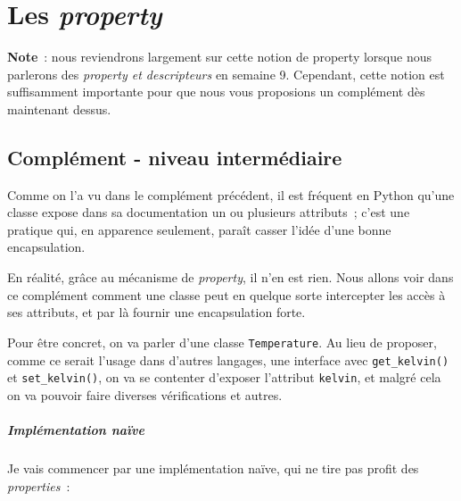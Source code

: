     
    
    
    

    

    \hypertarget{les-property}{%
\section{\texorpdfstring{Les
\emph{property}}{Les property}}\label{les-property}}

    \textbf{Note}~: nous reviendrons largement sur cette notion de property
lorsque nous parlerons des \emph{property et descripteurs} en semaine 9.
Cependant, cette notion est suffisamment importante pour que nous vous
proposions un complément dès maintenant dessus.

    \hypertarget{compluxe9ment---niveau-intermuxe9diaire}{%
\subsection{Complément - niveau
intermédiaire}\label{compluxe9ment---niveau-intermuxe9diaire}}

    Comme on l'a vu dans le complément précédent, il est fréquent en Python
qu'une classe expose dans sa documentation un ou plusieurs attributs~;
c'est une pratique qui, en apparence seulement, paraît casser l'idée
d'une bonne encapsulation.

En réalité, grâce au mécanisme de \emph{property}, il n'en est rien.
Nous allons voir dans ce complément comment une classe peut en quelque
sorte intercepter les accès à ses attributs, et par là fournir une
encapsulation forte.

    Pour être concret, on va parler d'une classe \texttt{Temperature}. Au
lieu de proposer, comme ce serait l'usage dans d'autres langages, une
interface avec \texttt{get\_kelvin()} et \texttt{set\_kelvin()}, on va
se contenter d'exposer l'attribut \texttt{kelvin}, et malgré cela on va
pouvoir faire diverses vérifications et autres.

    \hypertarget{impluxe9mentation-nauxefve}{%
\subparagraph{Implémentation naïve}\label{impluxe9mentation-nauxefve}}

    Je vais commencer par une implémentation naïve, qui ne tire pas profit
des \emph{properties}~:

